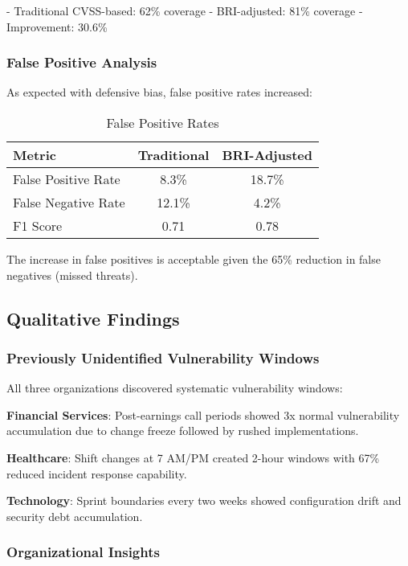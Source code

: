 \documentclass[11pt,a4paper]{article}
\begin{document}
- Traditional CVSS-based: 62\% coverage
- BRI-adjusted: 81\% coverage
- Improvement: 30.6\%

\subsubsection{False Positive Analysis}

As expected with defensive bias, false positive rates increased:

\begin{table}[h!]
\centering
\caption{False Positive Rates}
\label{tab:fp}
\begin{tabular}{lcc}
\toprule
Metric & Traditional & BRI-Adjusted \\
\midrule
False Positive Rate & 8.3\% & 18.7\% \\
False Negative Rate & 12.1\% & 4.2\% \\
F1 Score & 0.71 & 0.78 \\
\bottomrule
\end{tabular}
\end{table}

The increase in false positives is acceptable given the 65\% reduction in false negatives (missed threats).

\subsection{Qualitative Findings}

\subsubsection{Previously Unidentified Vulnerability Windows}

All three organizations discovered systematic vulnerability windows:

\textbf{Financial Services}: Post-earnings call periods showed 3x normal vulnerability accumulation due to change freeze followed by rushed implementations.

\textbf{Healthcare}: Shift changes at 7 AM/PM created 2-hour windows with 67\% reduced incident response capability.

\textbf{Technology}: Sprint boundaries every two weeks showed configuration drift and security debt accumulation.

\subsubsection{Organizational Insights}
\end{document}
